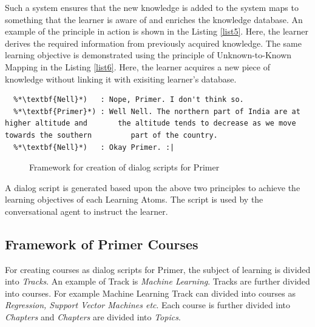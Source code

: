 \documentclass[]{article}
\begin{document}
Such a system ensures that the new knowledge is added to the system maps to something that the learner is aware of and enriches the knowledge database. An example of the principle in action is shown in the Listing \ref{list5}. Here, the learner derives the required information from previously acquired knowledge. The same learning objective is demonstrated using the principle of Unknown-to-Known Mapping in the Listing \ref{list6}. Here, the learner acquires a new piece of knowledge without linking it with exisiting learner's database.  

\begin{lstlisting}[frame=single,caption=Learning Atom using the principle of Unknown to Known Mapping, float,label=list6]
  %*\textbf{Primer}*) : Nell, can you describe the topographical nature of India.
  %*\textbf{Nell}*)   : Nope, Primer. I don't think so.
  %*\textbf{Primer}*) : Well Nell. The northern part of India are at higher altitude and       the altitude tends to decrease as we move towards the southern         part of the country.
  %*\textbf{Nell}*)   : Okay Primer. :|
  \end{lstlisting}


  \begin{figure}
      \caption{Framework for creation of dialog scripts for Primer }
      \label{fig3}
  \end{figure}

A dialog script is generated based upon the above two principles to achieve the learning objectives of each Learning Atoms. The script is used by the conversational agent to instruct the learner. 



\subsection[Framework]{Framework of Primer Courses}

For creating courses as dialog scripts for Primer, the subject of learning is divided into \textit{Tracks}. An example of Track is \textit{Machine Learning}. Tracks are further divided into courses. For example Machine Learning Track can divided into courses as \textit{Regression, Support Vector Machines etc}. Each course is further divided into \textit{Chapters} and \textit{Chapters} are divided into \textit{Topics}. 
\end{document}
